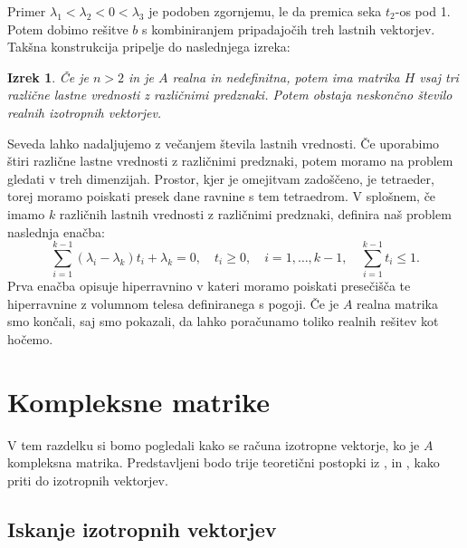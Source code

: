 \documentclass[12pt,a4paper]{amsart}
\theoremstyle{definition}
\theoremstyle{plain}
\newtheorem{izrek}[definicija]{Izrek}
\begin{document}
Primer $\lambda_1 <\lambda_2<0<\lambda_3$ je podoben zgornjemu, le da premica seka $t_2$-os pod 1. Potem dobimo rešitve $b$ s kombiniranjem pripadajočih treh lastnih vektorjev. %
Takšna konstrukcija pripelje do naslednjega izreka:
\begin{izrek} \cite{meurant}
Če je $n>2$ in je $A$ realna in nedefinitna, potem ima matrika $H$ vsaj tri različne lastne vrednosti z različnimi predznaki. Potem obstaja neskončno število realnih izotropnih vektorjev. 
\end{izrek}
Seveda lahko nadaljujemo z večanjem števila lastnih vrednosti. Če uporabimo štiri različne lastne vrednosti z različnimi predznaki, potem moramo na problem gledati v treh dimenzijah. Prostor, kjer je omejitvam zadoščeno, je tetraeder, torej moramo poiskati presek dane ravnine s tem tetraedrom. 
V splošnem, če imamo $k$ različnih lastnih vrednosti z različnimi predznaki, definira naš problem naslednja enačba:
\begin{equation}
\sum_{i=1}^{k-1} (\lambda_i -\lambda_k)t_i +\lambda_k =0,\quad t_i\ge0,\quad i=1,\dots,k-1,\quad \sum_{i=1}^{k-1}t_i \le1.
\end{equation}
Prva enačba opisuje hiperravnino v kateri moramo poiskati  presečišča te hiperravnine z volumnom telesa definiranega s pogoji.
Če je $A$ realna matrika smo končali, saj smo pokazali, da lahko poračunamo toliko realnih rešitev kot hočemo.

\section{Kompleksne matrike}
V tem razdelku si bomo pogledali kako se računa izotropne vektorje, ko je $A$ kompleksna matrika. Predstavljeni bodo trije teoretični postopki iz \cite{meurant},\cite{carden} in \cite{trije}, kako priti do izotropnih vektorjev.
\subsection{Iskanje izotropnih vektorjev}
\end{document}
